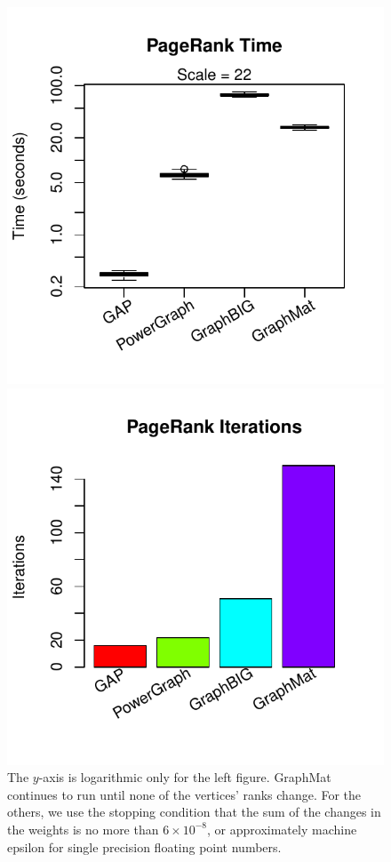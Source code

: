\documentclass[conference]{IEEEtran}
\begin{document}
\begin{figure}
	\centering
	\begin{minipage}{0.48\linewidth}
		\includegraphics[width=\linewidth, trim=0pt 18pt 18pt 0pt, clip]{graphics/pr_time.pdf}
	\end{minipage}
	\begin{minipage}{0.48\linewidth}
		\includegraphics[width=\linewidth, trim=0 18pt 18pt 0pt, clip]{graphics/pr_iters.pdf}
	\end{minipage}
	\caption{The $y$-axis is logarithmic only for the left figure. GraphMat continues to run until none of the vertices' ranks change. For the others, we use the stopping condition that the sum of the changes in the weights is no more than $6 \times 10^{-8}$, or approximately machine epsilon for single precision floating point numbers.}
	\label{fig:pr}
\end{figure}
\end{document}
